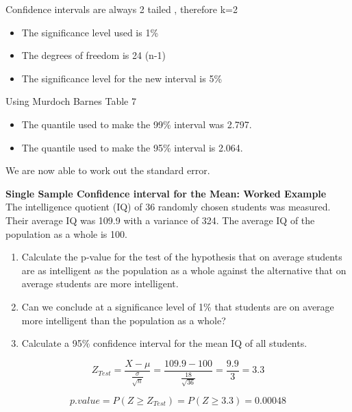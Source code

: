 Confidence intervals are always 2 tailed , therefore k=2
\begin{itemize}
\item The significance level used is 1\%
\item The degrees of freedom  is 24 (n-1)
\item The significance level for the new interval is 5\%
\end{itemize}
Using Murdoch Barnes Table 7
\begin{itemize}
\item The quantile used to make the 99\% interval was 2.797.
\item The quantile used to make the 95\% interval is 2.064.
\end{itemize}
We are now able to work out the standard error.


\item \textbf{Single Sample Confidence interval for the Mean: Worked Example}\\

The intelligence quotient (IQ) of 36 randomly chosen students was measured.
Their average IQ was 109.9 with a variance of 324.
The average IQ of the population as a whole is 100.

\begin{enumerate}
\item Calculate the p-value for the test of the hypothesis that on average
students are as intelligent as the population as a whole against the alternative that on average students are more intelligent.


\item Can we conclude at a significance level of 1\% that students are on average more intelligent than the population as a whole?

\item Calculate a 95\% confidence interval for the mean IQ of all students.

\end{enumerate}

\begin{equation}
Z_{Test} = \frac{X- \mu}{\frac{\sigma}{\sqrt{n}}} = \frac{109.9 - 100}{\frac{18}{\sqrt{36}}} = \frac{9.9}{3} = 3.3
\end{equation}


\begin{equation}
p.value = P(Z \geq Z_{Test}) = P(Z \geq 3.3) = 0.00048
\end{equation}



